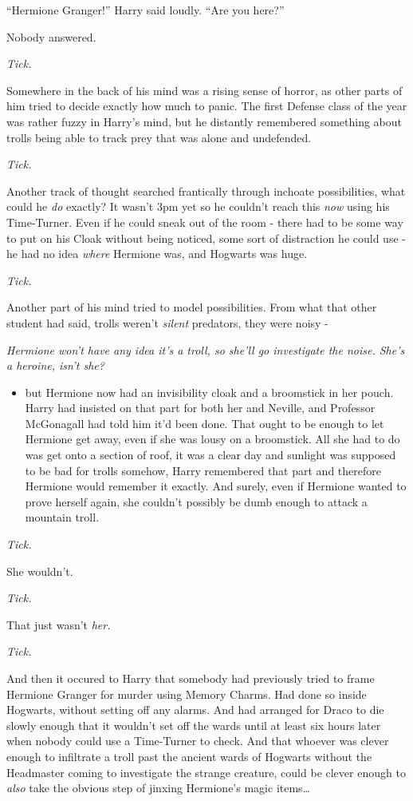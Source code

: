``Hermione Granger!'' Harry said loudly. ``Are you here?''

Nobody answered.

\emph{Tick.}

Somewhere in the back of his mind was a rising sense of horror, as other
parts of him tried to decide exactly how much to panic. The first
Defense class of the year was rather fuzzy in Harry's mind, but he
distantly remembered something about trolls being able to track prey
that was alone and undefended.

\emph{Tick.}

Another track of thought searched frantically through inchoate
possibilities, what could he \emph{do} exactly? It wasn't 3pm yet so he
couldn't reach this \emph{now} using his Time-Turner. Even if he could
sneak out of the room - there had to be some way to put on his Cloak
without being noticed, some sort of distraction he could use - he had no
idea \emph{where} Hermione was, and Hogwarts was huge.

\emph{Tick.}

Another part of his mind tried to model possibilities. From what that
other student had said, trolls weren't \emph{silent} predators, they
were noisy -

\emph{Hermione won't have any idea it's a troll, so she'll go
investigate the noise. She's a heroine, isn't she?}

\begin{itemize}
\itemsep1pt\parskip0pt
\item
  but Hermione now had an invisibility cloak and a broomstick in her
  pouch. Harry had insisted on that part for both her and Neville, and
  Professor McGonagall had told him it'd been done. That ought to be
  enough to let Hermione get away, even if she was lousy on a
  broomstick. All she had to do was get onto a section of roof, it was a
  clear day and sunlight was supposed to be bad for trolls somehow,
  Harry remembered that part and therefore Hermione would remember it
  exactly. And surely, even if Hermione wanted to prove herself again,
  she couldn't possibly be dumb enough to attack a mountain troll.
\end{itemize}

\emph{Tick.}

She wouldn't.

\emph{Tick.}

That just wasn't \emph{her.}

\emph{Tick.}

And then it occured to Harry that somebody had previously tried to frame
Hermione Granger for murder using Memory Charms. Had done so inside
Hogwarts, without setting off any alarms. And had arranged for Draco to
die slowly enough that it wouldn't set off the wards until at least six
hours later when nobody could use a Time-Turner to check. And that
whoever was clever enough to infiltrate a troll past the ancient wards
of Hogwarts without the Headmaster coming to investigate the strange
creature, could be clever enough to \emph{also} take the obvious step of
jinxing Hermione's magic items\ldots{}


